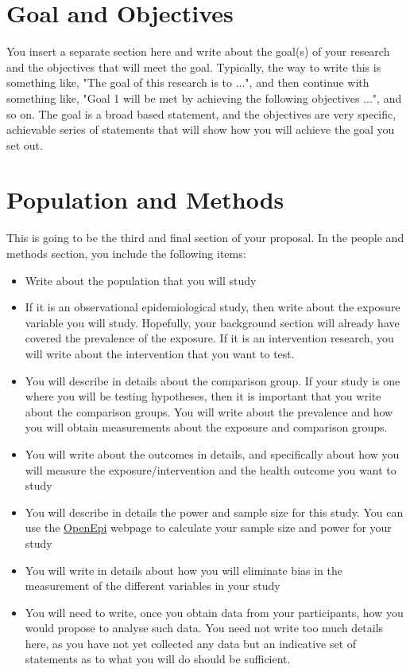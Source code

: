 \section*{Goal and Objectives}

You insert a separate section here and write about the goal(s) of your research and the objectives that will meet the goal. Typically, the way to write this is something like, "The goal of this research is to ...", and then continue with something like, "Goal 1 will be met by achieving the following objectives ...", and so on. The goal is a broad based statement, and the objectives are very specific, achievable series of statements that will show how you will achieve the goal you set out. 

\section*{Population and Methods}

This is going to be the third and final section of your proposal. In the people and methods section, you include the following items:

\begin{itemize}
	\item Write about the population that you will study
	\item If it is an observational epidemiological study, then write about the exposure variable you will study. Hopefully, your background section will already have covered the prevalence of the exposure. If it is an intervention research, you will write about the intervention that you want to test.
	\item You will describe in details about the comparison group. If your study is one where you will be testing hypotheses, then it is important that you write about the comparison groups. You will write about the prevalence and how you will obtain measurements about the exposure and comparison groups.
	\item You will write about the outcomes in details, and specifically about how you will measure the exposure/intervention and the health outcome you want to study
	\item You will describe in details the power and sample size for this study. You can use the \href{http://www.openepi.com/Menu/OE_Menu.htm}{OpenEpi} webpage to calculate your sample size and power for your study
	\item You will write in details about how you will eliminate bias in the measurement of the different variables in your study
	\item You will need to write, once you obtain data from your participants, how you would propose to analyse such data. You need not write too much details here, as you have not yet collected any data but an indicative set of statements as to what you will do should be sufficient. 
\end{itemize}

